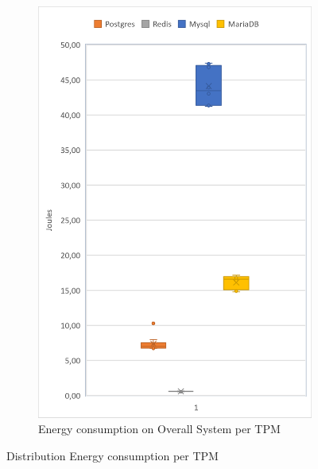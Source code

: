 \begin{figure}[!ht]
\begin{subfigure}[b]{0.32\textwidth}
            \includegraphics[width=1\columnwidth]{results/boxplot/10m/total-tpm.png}
            \caption[]%
            {{\small Energy consumption on Overall System per TPM}}    
            \label{fig:bocplottranstotal10m}
        \end{subfigure}
        \caption[ Distribution of Energy consumption per TPM  ]
        {\small Distribution Energy consumption per TPM } 
        \label{fig:bocplottrans10m}
    \end{figure}
   





